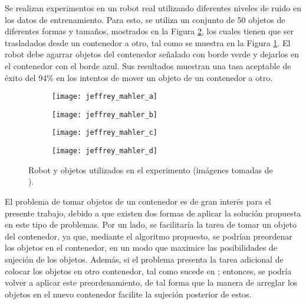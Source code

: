 Se realizan experimentos en un robot real utilizando diferentes niveles de ruido en los datos de entrenamiento.
Para esto, se utiliza un conjunto de 50 objetos de diferentes formas y tamaños, mostrados en la Figura \ref{subfig:fifty_objects}, los cuales tienen que ser trasladados desde un contenedor a otro, tal como se muestra en la Figura \ref{subfig:object_picking}.
El robot debe agarrar objetos del contenedor señalado con borde verde y dejarlos en el contenedor con el borde azul.
Sus resultados muestran una tasa aceptable de éxito del 94\!\% en los intentos de mover un objeto de un contenedor a otro.
%
\begin{figure}[H]
	\begin{subfigure}[t]{0.275\linewidth}
		\texttt{[image: jeffrey\_mahler\_a]}%
		\subcaption{}%
		\label{subfig:object_picking}%
	\end{subfigure}%
	\hspace{10pt}%
	\begin{subfigure}[t]{0.45\linewidth}
		\texttt{[image: jeffrey\_mahler\_b]}%
		\subcaption{}%
		\label{subfig:fifty_objects}%
	\end{subfigure}%
	\begin{minipage}[b][4cm]{3.2cm}%
	\begin{subfigure}[t]{\linewidth}
		\texttt{[image: jeffrey\_mahler\_c]}%
	\end{subfigure}%
	\vfill%
	\begin{subfigure}[t]{\linewidth}
		\texttt{[image: jeffrey\_mahler\_d]}%
		\subcaption{}%
		\label{subfig:depth_image}%
	\end{subfigure}%
	\end{minipage}%
	\caption{Robot y objetos utilizados en el experimento (imágenes tomadas de \cite{pmlr-v78-mahler17a}).}%
	\label{fig:pmlr-v78-mahler17a}%
\end{figure}
%
El problema de tomar objetos de un contenedor es de gran interés para el presente trabajo, debido a que existen dos formas de aplicar la solución propuesta en este tipo de problemas.
Por un lado, se facilitaría la tarea de tomar un objeto del contenedor, ya que, mediante el algoritmo propuesto, se podrían preordenar los objetos en el contenedor, en un modo que maximice las posibilidades de sujeción de los objetos.
Además, si el problema presenta la tarea adicional de colocar los objetos en otro contenedor, tal como sucede en \cite{8793966}; entonces, se podría volver a aplicar este preordenamiento, de tal forma que la manera de arreglar los objetos en el nuevo contenedor facilite la sujeción posterior de estos.
